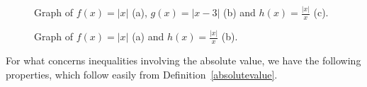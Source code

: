\begin{example}
\begin{enumerate}
\end{enumerate}

\begin{figure}[H]
\centering
\centerline{
\hspace{2cm}
\ifvc{}\fi
\ifcourse{}\fi
}
\ifvc
\caption{Graph of $f(x) = \left|x\right|$ (a), $g(x)=\left|x-3\right|$ (b) and $h(x) = \frac{\left|x\right|}{x}$ (c). }
\fi
\ifcourse
\caption{Graph of $f(x) = \left|x\right|$ (a) and $h(x) = \frac{\left|x\right|}{x}$ (b). }
\fi
\end{figure}


\end{example}


	\checkoddpage
{}
For what concerns inequalities involving the absolute value, we have the following properties, which follow easily from Definition~\ref{absolutevalue}.

